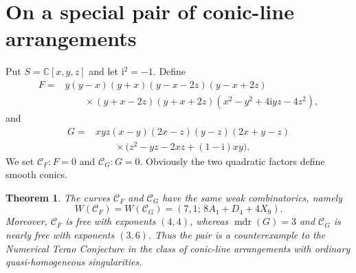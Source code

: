 \documentclass[11pt]{article}
\newtheorem{theorem}{Theorem}[section]
\theoremstyle{remark}
\newcommand{\mdr}{\operatorname{mdr}}
\newcommand{\ii}{\mathrm i}
\begin{document}
\section{On a special pair of conic-line arrangements}

Put $S=\mathbb C[x,y,z]$ and let $\ii^2=-1$.  Define
\begin{align*}
 F={}&y(y-x)(y+x)(y-x-2z)(y-x+2z)\\
 &\qquad\times (y+x-2z)(y+x+2z)
       (x^2-y^2+4\ii yz-4z^2),
\end{align*}
and
\begin{align*}
 G={}&xyz(x-y)(2x-z)(y-z)(2x+y-z)\\
 &\qquad\times \bigl(z^2-yz-2xz+(1-\ii)xy\bigr).
\end{align*}
We set $\mathcal C_F : F=0$ and $\mathcal C_G : G=0$. Obviously the two quadratic factors define smooth conics. 
\begin{theorem}\label{thm:counterexample}
The curves $\mathcal C_F$ and $\mathcal C_G$ have the same weak
combinatorics, namely
\[
 W(\mathcal C_F)=W(\mathcal C_G)
 =(7,1;\,8A_1+D_4+4X_9).
\]
Moreover, $\mathcal C_F$ is free with exponents $(4,4)$, whereas
$ \mdr(G)=3$ and $\mathcal{C}_G$ is nearly free with exponents $(3,6)$.
Thus the pair is a counterexample to the Numerical Terao Conjecture in the class of conic-line arrangements with ordinary quasi-homogeneous singularities. 
\end{theorem}
\end{document}
